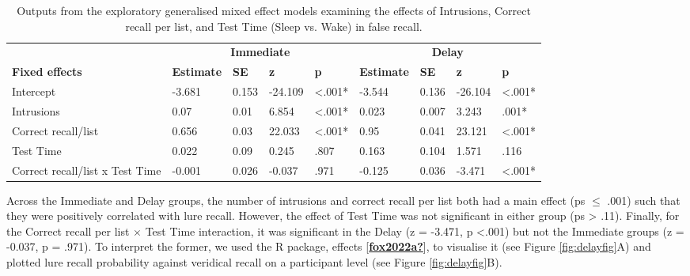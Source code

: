 \documentclass[
]{article}
\begin{document}
\begin{table}[H]

\caption{\label{tab:table7}Outputs from the exploratory generalised mixed effect models examining the effects of Intrusions, Correct recall per list, and Test Time (Sleep vs. Wake) in false recall.}
\centering
\begin{tabular}[t]{lllllllll}
\toprule
\multicolumn{1}{c}{\textbf{}} & \multicolumn{4}{c}{\textbf{Immediate}} & \multicolumn{4}{c}{\textbf{Delay}} \\
\cmidrule(l{3pt}r{3pt}){2-5} \cmidrule(l{3pt}r{3pt}){6-9}
\textbf{Fixed effects} & \textbf{Estimate} & \textbf{SE} & \textbf{z} & \textbf{p} & \textbf{Estimate} & \textbf{SE} & \textbf{z} & \textbf{p}\\
\midrule
Intercept & -3.681 & 0.153 & -24.109 & <.001* & -3.544 & 0.136 & -26.104 & <.001*\\
Intrusions & 0.07 & 0.01 & 6.854 & <.001* & 0.023 & 0.007 & 3.243 & .001*\\
Correct recall/list & 0.656 & 0.03 & 22.033 & <.001* & 0.95 & 0.041 & 23.121 & <.001*\\
Test Time & 0.022 & 0.09 & 0.245 & .807 & 0.163 & 0.104 & 1.571 & .116\\
Correct recall/list x Test Time & -0.001 & 0.026 & -0.037 & .971 & -0.125 & 0.036 & -3.471 & <.001*\\
\bottomrule
\end{tabular}
\end{table}

Across the Immediate and Delay groups, the number of intrusions and correct recall per list both had a main effect (ps \(\leq\) .001) such that they were positively correlated with lure recall. However, the effect of Test Time was not significant in either group (ps \textgreater{} .11). Finally, for the Correct recall per list \(\times\) Test Time interaction, it was significant in the Delay (z = -3.471, p \textless.001) but not the Immediate groups (z = -0.037, p = .971). To interpret the former, we used the R package, effects {[}\protect\hyperlink{ref-fox2022a}{\textbf{fox2022a?}}{]}, to visualise it (see Figure \ref{fig:delayfig}A) and plotted lure recall probability against veridical recall on a participant level (see Figure \ref{fig:delayfig}B).
\end{document}
